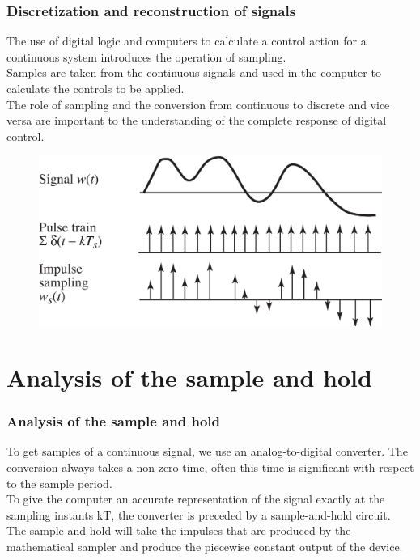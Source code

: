 \begin{frame}
	\frametitle{Discretization and reconstruction of signals}
	The use of digital logic and computers to calculate a control action for a continuous system introduces the operation of sampling.\\
	\medskip
	Samples are taken from the continuous signals and used in the computer to calculate the controls to be applied.\\
	\medskip
	The role of sampling and the conversion from continuous to discrete and vice versa are important to the understanding of the complete response of digital control.
	\begin{figure}
		\includegraphics[width=.6\linewidth]{discretization}
	\end{figure}
\end{frame}

\section{Analysis of the sample and hold}

\begin{frame}
	\frametitle{Analysis of the sample and hold}
	\vspace{-6ex}
	To get samples of a continuous signal, we use an analog-to-digital converter. The conversion always takes a non-zero time, often this time is significant with respect to the sample period.\\
	\medskip
	To give the computer an accurate representation of the signal exactly at the sampling instants kT, the converter is preceded by a sample-and-hold circuit.\\
	The sample-and-hold will take the impulses that are produced by the mathematical sampler and produce the piecewise constant output of the device.
\end{frame}

